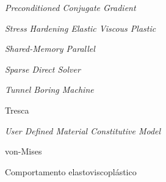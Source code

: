 \item[PCG]		\textit{Preconditioned Conjugate Gradient}
\item[SHELVIP] 	\textit{Stress Hardening Elastic Viscous Plastic}
\item[SMP] 	\textit{Shared-Memory Parallel}
\item[SPARSE] 	\textit{Sparse Direct Solver}
\item[TBM] 		\textit{Tunnel Boring Machine}
\item[TR] 		Tresca
\item[USERMAT] 		\textit{User Defined Material Constitutive Model}
\item[VM] 		von-Mises
\item[VP] 		Comportamento elastoviscoplástico


